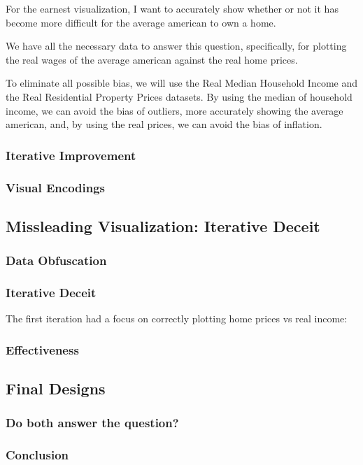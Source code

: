 \documentclass{article}
\begin{document}
For the earnest visualization, I want to accurately show whether or not it has become
more difficult for the average american to own a home. 

We have all the necessary data to answer this question, specifically, for plotting the
real wages of the average american against the real home prices.

To eliminate all possible bias, we will use the Real Median Household Income 
and the Real Residential Property Prices datasets. By using the median of household income,
we can avoid the bias of outliers, more accurately showing the average american, 
and, by using the real prices, we can avoid the bias of inflation. 

\subsubsection{Iterative Improvement}

\subsubsection{Visual Encodings}

\subsection{Missleading Visualization: Iterative Deceit}
\subsubsection{Data Obfuscation}
\subsubsection{Iterative Deceit}
The first iteration had a focus on correctly plotting home prices vs real income:
\subsubsection{Effectiveness}

\subsection{Final Designs}
\subsubsection{Do both answer the question?}
\subsubsection{Conclusion}

\newpage
\begin{refcontext}[sorting=nyt]
\printbibliography
\end{refcontext}
\end{document}
